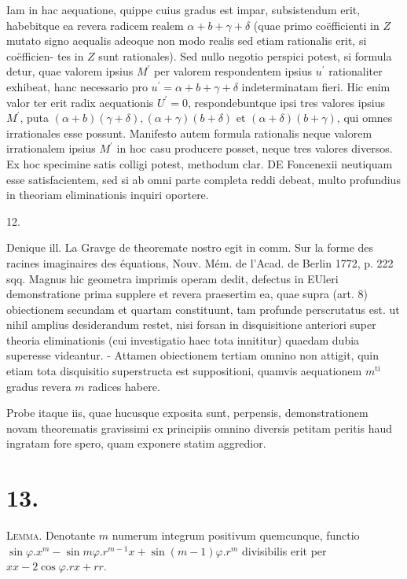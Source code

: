 \documentclass[twoside,12pt, showframe]{memoir}
\begin{document}
Iam in hac aequatione, quippe cuius gradus est impar, subsistendum erit, habebitque ea revera radicem realem \(\alpha+b+\gamma+\delta\) (quae primo coëfficienti in \(Z\) mutato signo aequalis adeoque non modo realis sed etiam rationalis erit, si coëfficien-
tes in \(Z\) sunt rationales). Sed nullo negotio perspici potest, si formula detur, quae valorem ipsius \(M^{\prime}\) per valorem respondentem ipsius \(u^{\prime}\) rationaliter exhibeat, hanc necessario pro \(u^{\prime}=\alpha+b+\gamma+\delta\) indeterminatam fieri. Hic enim valor ter erit radix aequationis \(U^{\prime}=0\), respondebuntque ipsi tres valores ipsius \(M^{\prime}\), puta \((\alpha+b)(\gamma+\delta),(\alpha+\gamma)(b+\delta)\) et \((\alpha+\delta)(b+\gamma)\), qui omnes irrationales esse possunt. Manifesto autem formula rationalis neque valorem irrationalem ipsius \(M^{\prime}\) in hoc casu producere posset, neque tres valores diversos. Ex hoc specimine satis colligi potest, methodum clar. DE Foncenexii neutiquam esse satisfacientem, sed si ab omni parte completa reddi debeat, multo profundius in theoriam eliminationis inquiri oportere.

12.

Denique ill. La Gravge de theoremate nostro egit in comm. Sur la forme des racines imaginaires des équations, Nouv. Mém. de l'Acad. de Berlin 1772, p. 222 sqq. Magnus hic geometra imprimis operam dedit, defectus in EUleri demonstratione prima supplere et revera praesertim ea, quae supra (art. 8) obiectionem secundam et quartam constituunt, tam profunde perscrutatus est. ut nihil amplius desiderandum restet, nisi forsan in disquisitione anteriori super theoria eliminationis (cui investigatio haec tota innititur) quaedam dubia superesse videantur. - Attamen obiectionem tertiam omnino non attigit, quin etiam tota disquisitio superstructa est suppositioni, quamvis aequationem \(m^{\text {ti }}\) gradus revera \(m\) radices habere.

Probe itaque iis, quae hucusque exposita sunt, perpensis, demonstrationem novam theorematis gravissimi ex principiis omnino diversis petitam peritis haud ingratam fore spero, quam exponere statim aggredior.

\section*{13.}
\textsc{Lemma.} Denotante \(m\) numerum integrum positivum quemcunque, functio \(\sin \varphi . x^{m}-\sin m \varphi . r^{m-1} x+\sin (m-1) \varphi . r^{m}\) divisibilis erit per \(x x-2 \cos \varphi . r x+r r\).
\end{document}
